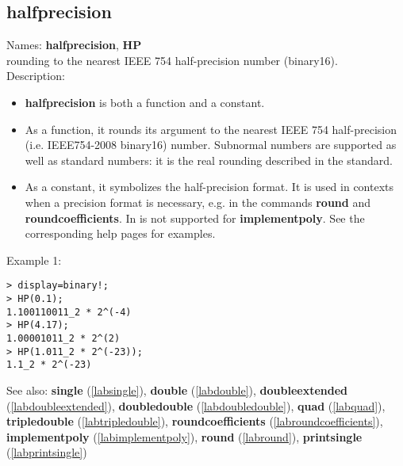 \subsection{halfprecision}
\label{labhalfprecision}
\noindent Names: \textbf{halfprecision}, \textbf{HP}\\
rounding to the nearest IEEE 754 half-precision number (binary16).\\
\noindent Description: \begin{itemize}

\item \textbf{halfprecision} is both a function and a constant.

\item As a function, it rounds its argument to the nearest IEEE 754 half-precision (i.e. IEEE754-2008 binary16) number.
   Subnormal numbers are supported as well as standard numbers: it is the real
   rounding described in the standard.

\item As a constant, it symbolizes the half-precision format. It is used in 
   contexts when a precision format is necessary, e.g. in the commands 
   \textbf{round} and \textbf{roundcoefficients}. In is not supported for \textbf{implementpoly}.
   See the corresponding help pages for examples.
\end{itemize}
\noindent Example 1: 
\begin{center}\begin{minipage}{15cm}\begin{Verbatim}[frame=single]
> display=binary!;
> HP(0.1);
1.100110011_2 * 2^(-4)
> HP(4.17);
1.00001011_2 * 2^(2)
> HP(1.011_2 * 2^(-23));
1.1_2 * 2^(-23)
\end{Verbatim}
\end{minipage}\end{center}
See also: \textbf{single} (\ref{labsingle}), \textbf{double} (\ref{labdouble}), \textbf{doubleextended} (\ref{labdoubleextended}), \textbf{doubledouble} (\ref{labdoubledouble}), \textbf{quad} (\ref{labquad}), \textbf{tripledouble} (\ref{labtripledouble}), \textbf{roundcoefficients} (\ref{labroundcoefficients}), \textbf{implementpoly} (\ref{labimplementpoly}), \textbf{round} (\ref{labround}), \textbf{printsingle} (\ref{labprintsingle})
